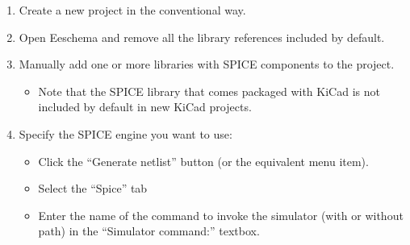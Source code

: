 
\begin{enumerate}
\item Create a new project in the conventional way.
\item Open Eeschema and remove all the library references included by default.
\item Manually add one or more libraries with SPICE components to the project.
\begin{itemize}
  \item Note that the SPICE library that comes packaged with KiCad is not
  included by default in new KiCad projects.
\end{itemize}
\item Specify the SPICE engine you want to use:
\begin{itemize}
  \item Click the “Generate netlist” button (or the equivalent menu item).
  \item Select the “Spice” tab
  \item Enter the name of the command to invoke the simulator (with or without
path) in the “Simulator command:” textbox.
\end{itemize}
\end{enumerate}


